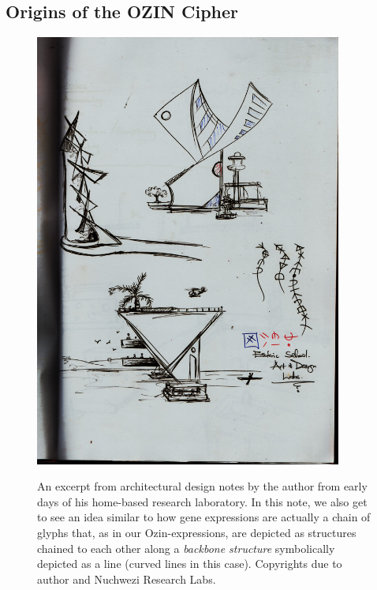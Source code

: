 \documentclass[a4paper, 18pt]{book} %
\begin{document}

\begin{appendices}

\chapter{Origins of the OZIN Cipher}
\label{APPOZIN}

\begin{figure}[H]
  \begin{center}
   \includegraphics[trim=0cm 4cm 0cm 2.8cm, clip, width=0.9\textwidth,]{resources/pdfs/ozin_gene_expressions.pdf}\\
   \caption{An excerpt from architectural design notes by the author from early days of his home-based research laboratory. In this note, we also get to see an idea similar to how gene expressions are actually a chain of glyphs that, as in our Ozin-expressions, are depicted as structures chained to each other along a \textit{backbone structure} symbolically depicted as a line (curved lines in this case). Copyrights due to author and Nuchwezi Research Labs.}
  \label{FIGCODEOZINART}
  \end{center}
\end{figure}



\end{appendices}
\end{document}
